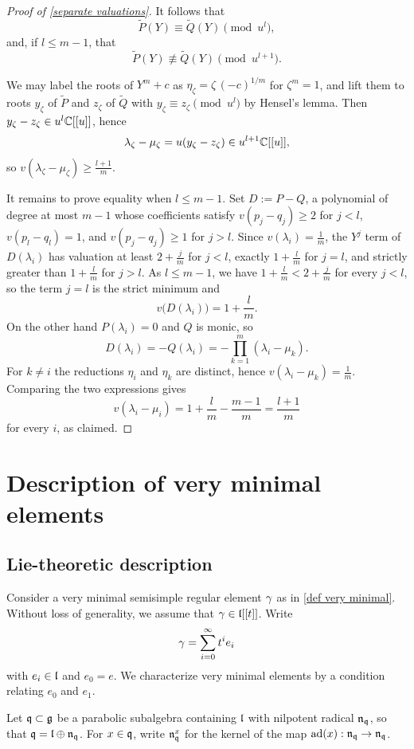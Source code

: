 \documentclass[11pt]{article}
\numberwithin{equation}{section}
\begin{document}
\begin{appendix}
\begin{proof}[Proof of \cref{separate valuations}]
It follows that
\[
\widetilde P(Y)\equiv \widetilde Q(Y) \pmod{u^l},
\]
and, if $l\leqslant m-1$, that
\[
\widetilde P(Y)\not\equiv \widetilde Q(Y) \pmod{u^{l+1}}.
\]

We may label the roots of $Y^m+c$ as $\eta_\zeta=\zeta\,(-c)^{1/m}$ for $\zeta^m=1$,
and lift them to roots $y_\zeta$ of $\widetilde P$ and $z_\zeta$ of $\widetilde Q$
with $y_\zeta\equiv z_\zeta\pmod{u^l}$ by Hensel's lemma.
Then $y_\zeta-z_\zeta\in u^l\mathbb{C}[[u]]$, hence
\[
\lambda_\zeta-\mu_\zeta
= u(y_\zeta-z_\zeta)
\in u^{l+1}\mathbb{C}[[u]],
\]
so $v(\lambda_\zeta-\mu_\zeta)\ge \frac{l+1}{m}$.

It remains to prove equality when $l\le m-1$. Set $D:=P-Q$, a polynomial of degree at
most $m-1$ whose coefficients satisfy $v(p_j-q_j)\ge 2$ for $j<l$, $v(p_l-q_l)=1$, and
$v(p_j-q_j)\ge 1$ for $j>l$. Since $v(\lambda_i)=\frac1m$, the $Y^j$ term of
$D(\lambda_i)$ has valuation at least $2+\frac jm$ for $j<l$, exactly $1+\frac lm$ for
$j=l$, and strictly greater than $1+\frac lm$ for $j>l$. As $l\le m-1$, we have
$1+\frac lm<2+\frac jm$ for every $j<l$, so the term $j=l$ is the strict minimum and
\[
v\bigl(D(\lambda_i)\bigr)=1+\frac{l}{m}.
\]
On the other hand $P(\lambda_i)=0$ and $Q$ is monic, so
\[
D(\lambda_i)=-Q(\lambda_i)=-\prod_{k=1}^{m}(\lambda_i-\mu_k).
\]
For $k\neq i$ the reductions $\eta_i$ and $\eta_k$ are distinct, hence
$v(\lambda_i-\mu_k)=\frac1m$. Comparing the two expressions gives
\[
v(\lambda_i-\mu_i)=1+\frac{l}{m}-\frac{m-1}{m}=\frac{l+1}{m}
\]
for every $i$, as claimed.
\end{proof}
\section{Description of very minimal elements}
\subsection{Lie-theoretic description}
Consider a very minimal semisimple regular element $\gamma$ as in \cref{def very minimal}. Without loss of generality, we assume that $\gamma\in \mathfrak{l}[[t]]$. Write $$\gamma= \sum_{i=0}^\infty t^ie_i$$ with $e_i\in \mathfrak{l}$ and $e_0=e$. We characterize very minimal elements by a condition relating $e_0$ and $e_1$.

Let $\mathfrak{q}\subset \mathfrak{g}$ be a parabolic subalgebra containing $\mathfrak{l}$ with nilpotent radical $\mathfrak{n}_{\mathfrak{q}}$, so that $\mathfrak{q}=\mathfrak{l}\oplus \mathfrak{n}_{\mathfrak{q}}$. For $x\in \mathfrak{q}$, write $\mathfrak{n}_{\mathfrak{q}}^{x}$ for the kernel of the map $\operatorname{ad}(x): \mathfrak{n}_{\mathfrak{q}}\to \mathfrak{n}_{\mathfrak{q}}$.  


\end{appendix}
\end{document}
